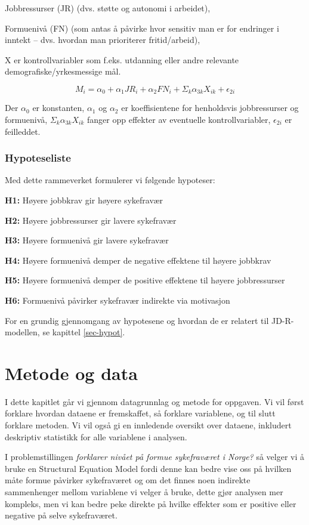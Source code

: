 \documentclass[
  12pt,
  a4paper,
  DIV=11,
  numbers=noendperiod]{scrartcl}
\begin{document}
Jobbressurser (JR) (dvs. støtte og autonomi i arbeidet),

Formuenivå (FN) (som antas å påvirke hvor sensitiv man er for endringer
i inntekt -- dvs. hvordan man prioriterer fritid/arbeid),

X er kontrollvariabler som f.eks. utdanning eller andre relevante
demografiske/yrkesmessige mål.

\[
M_i = \alpha_0 + \alpha_1 JR_i + \alpha_2 FN_i + \Sigma_k \alpha_{3k}X_{ik} + \epsilon_{2i}
\]

Der \(\alpha_0\) er konstanten, \(\alpha_1\) og \(\alpha_2\) er
koeffisientene for henholdsvis jobbressurser og formuenivå,
\(\Sigma_k \alpha_{3k}X_{ik}\) fanger opp effekter av eventuelle
kontrollvariabler, \(\epsilon_{2i}\) er feilleddet.

\subsubsection{Hypoteseliste}\label{hypoteseliste}

Med dette rammeverket formulerer vi følgende hypoteser:

\textbf{H1:} Høyere jobbkrav gir høyere sykefravær

\textbf{H2:} Høyere jobbressurser gir lavere sykefravær

\textbf{H3:} Høyere formuenivå gir lavere sykefravær

\textbf{H4:} Høyere formuenivå demper de negative effektene til høyere
jobbkrav

\textbf{H5:} Høyere formuenivå demper de positive effektene til høyere
jobbressurser

\textbf{H6:} Formuenivå påvirker sykefravær indirekte via motivasjon

For en grundig gjennomgang av hypotesene og hvordan de er relatert til
JD-R-modellen, se kapittel \ref{sec-hypot}.

\section{Metode og data}\label{metode-og-data}

I dette kapitlet går vi gjennom datagrunnlag og metode for oppgaven. Vi
vil først forklare hvordan dataene er fremskaffet, så forklare
variablene, og til slutt forklare metoden. Vi vil også gi en innledende
oversikt over dataene, inkludert deskriptiv statistikk for alle
variablene i analysen.

I problemstillingen \emph{forklarer nivået på formue sykefraværet i
Norge?} så velger vi å bruke en Structural Equation Model fordi denne
kan bedre vise oss på hvilken måte formue påvirker sykefraværet og om
det finnes noen indirekte sammenhenger mellom variablene vi velger å
bruke, dette gjør analysen mer kompleks, men vi kan bedre peke direkte
på hvilke effekter som er positive eller negative på selve sykefraværet.
\end{document}

